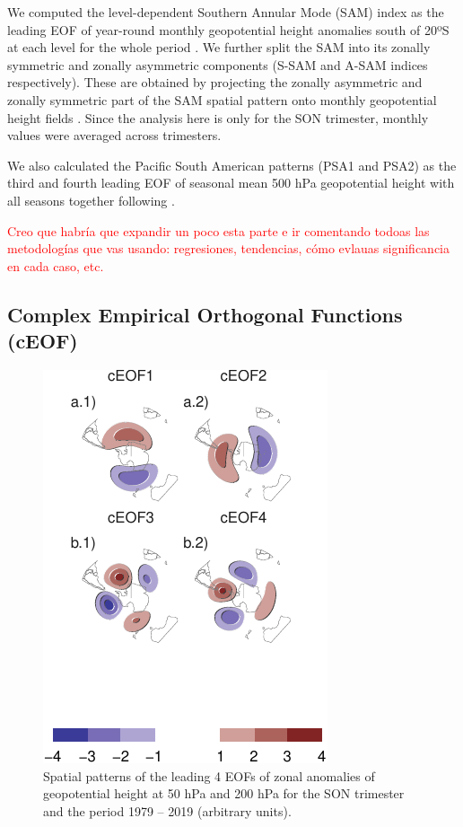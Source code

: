 \documentclass[smallextended]{svjour3}       %
\begin{document}
We computed the level-dependent Southern Annular Mode (SAM) index as the leading EOF of year-round monthly geopotential height anomalies south of 20ºS at each level for the whole period \citep{baldwin2009}. We further split the SAM into its zonally symmetric and zonally asymmetric components (S-SAM and A-SAM indices respectively). These are obtained by projecting the zonally asymmetric and zonally symmetric part of the SAM spatial pattern onto monthly geopotential height fields \citep{campitelli2021}. Since the analysis here is only for the SON trimester, monthly values were averaged across trimesters.

We also calculated the Pacific South American patterns (PSA1 and PSA2) as the third and fourth leading EOF of seasonal mean 500 hPa geopotential height with all seasons together following \citet{mo2001}.

\textcolor{red}{Creo que habría que expandir un poco esta parte e ir comentando todoas las metodologías que vas usando: regresiones, tendencias, cómo evlauas significancia en cada caso, etc. }

\hypertarget{complex-empirical-orthogonal-functions-ceof}{%
\subsection{Complex Empirical Orthogonal Functions (cEOF)}\label{complex-empirical-orthogonal-functions-ceof}}



\begin{figure}
\centering
\includegraphics{../figures/eof-naive-1.pdf}
\caption{\label{fig:eof-naive}Spatial patterns of the leading 4 EOFs of zonal anomalies of geopotential height at 50 hPa and 200 hPa for the SON trimester and the period 1979 -- 2019 (arbitrary units).}
\end{figure}
\end{document}

